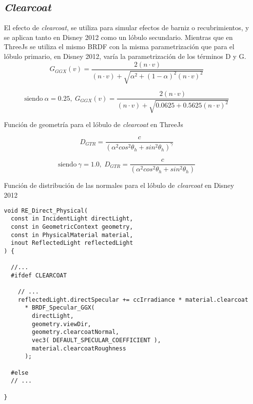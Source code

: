   \subsection*{\textit{Clearcoat}}
  El efecto de \textit{clearcoat}, se utiliza para simular efectos de barniz o recubrimientos, y se aplican tanto en Disney
  2012 como un l\'obulo secundario. Mientras que en ThreeJs se utiliza el mismo BRDF con la misma parametrizaci\'on que para
  el l\'obulo primario, en Disney 2012, var\'ia la parametrizaci\'on de los t\'erminos D y G.\\

  $$
  G_{GGX}(v) = \frac
  {2 (n \cdot{v})}
  {(n \cdot{v}) + \sqrt{ \alpha^2 + (1 - \alpha)^2 (n \cdot{v})^2 }}
  $$
  \begin{eqfloat}[!htb]
    \begin{equation}
    \textrm{siendo}\ \alpha=0.25,\;
    G_{GGX}(v) = \frac
    {2 (n \cdot{v})}
    {(n \cdot{v}) + \sqrt{ 0.0625 + 0.5625 (n \cdot{v})^2 }}
    \end{equation}
  \caption{Funci\'on de geometr\'ia para el l\'obulo de \textit{clearcoat} en ThreeJs}
  \end{eqfloat}
  \singlespacing

  $$
  D_{GTR} = \frac
  {c}
  {(\alpha^2 cos^2 \theta_h + sin^2 \theta_h)^\gamma}
  $$
  \begin{eqfloat}[!htb]
    \begin{equation}
    \textrm{siendo}\ \gamma=1.0,\;
    D_{GTR} = \frac
    {c}
    {(\alpha^2 cos^2 \theta_h + sin^2 \theta_h)}
    \end{equation}
  \caption{Funci\'on de distribuci\'on de las normales para el l\'obulo de \textit{clearcoat} en Disney 2012}
  \end{eqfloat}
  \singlespacing

  \begin{lstlisting}[caption={Implementaci\'on del l\'obulo de \textit{clearcoat} en ThreeJs}]
void RE_Direct_Physical(
  const in IncidentLight directLight,
  const in GeometricContext geometry,
  const in PhysicalMaterial material,
  inout ReflectedLight reflectedLight
) {

  //...
  #ifdef CLEARCOAT

    // ...
    reflectedLight.directSpecular += ccIrradiance * material.clearcoat
      * BRDF_Specular_GGX(
        directLight,
        geometry.viewDir,
        geometry.clearcoatNormal,
        vec3( DEFAULT_SPECULAR_COEFFICIENT ),
        material.clearcoatRoughness
      );

  #else
  // ...

}
  \end{lstlisting}
  
